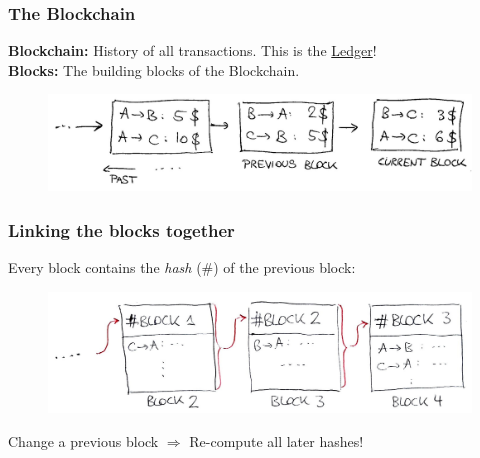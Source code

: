 \documentclass[12pt]{beamer}
\theoremstyle{definition}
\numberwithin{equation}{section}
\begin{document}
\begin{frame}
\frametitle{The Blockchain}
\textbf{Blockchain:} History of all transactions. This is the \underline{Ledger}!\\
\textbf{Blocks:} The building blocks of the Blockchain.


%   
\begin{figure}
\includegraphics[scale=0.2, trim = {45mm 0mm 0mm 0mm}]{fig1}
\end{figure}
\end{frame}

\begin{frame}
\frametitle{Linking the blocks together}
Every block contains the \emph{hash} (\#) of the previous block:

\begin{figure}
\includegraphics[scale=0.28, trim = {100mm 0mm 0mm 0mm}]{fig2.jpg}
\end{figure}
\pause
Change a previous block $\Rightarrow$ Re-compute all later hashes!

\end{frame}
\end{document}
